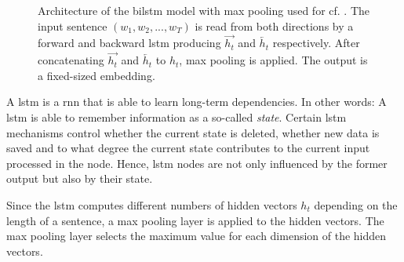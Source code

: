 \begin{figure}[htp] %
    \centering
    
    \caption{Architecture of the \ac{bilstm} model with max pooling used for \infersent{} cf. \cite{inferSent2018}.
    The input sentence $(w_1, w_2, ..., w_T)$ is read from both directions by a forward and backward \ac{lstm} 
    producing $\overrightarrow{h_t}$ and $\overleftarrow{h_t}$ respectively.
    After concatenating $\overrightarrow{h_t}$ and $\overleftarrow{h_t}$ to $h_t$, max pooling is applied.
    The output is a fixed-sized embedding.
    }
    \label{fig:infersent_bilstm}
\end{figure}

A \ac{lstm} is a \ac{rnn} that is able to learn long-term dependencies.
In other words: 
A \ac{lstm} is able to remember information as a so-called \textit{state}.
Certain \ac{lstm} mechanisms control whether the current state is deleted, whether new data is saved and 
to what degree the current state contributes to the current input processed in the node.
Hence, \ac{lstm} nodes are not only influenced by the former output but also by their state.

Since the \ac{lstm} computes different numbers of hidden vectors $h_t$ depending on the length of a sentence, a max pooling layer is applied to the hidden vectors.
The max pooling layer selects the maximum value for each dimension of the hidden vectors.

